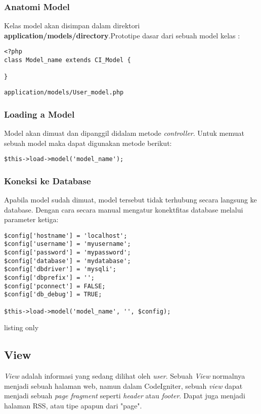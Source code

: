\subsubsection{Anatomi Model}
\label{sssec:model_1}
Kelas model akan disimpan dalam direktori \textbf{application/models/directory}.Prototipe dasar dari sebuah model kelas :

\begin{lstlisting}[frame=single]  
<?php
class Model_name extends CI_Model {

}
\end{lstlisting}

\begin{lstlisting}[frame=single]  
application/models/User_model.php
\end{lstlisting}

\subsubsection{Loading a Model}
\label{sssec:model_2}

Model akan dimuat dan dipanggil didalam metode \textit{controller}. Untuk memuat sebuah model maka dapat digunakan metode berikut:

\begin{lstlisting}[frame=single] 
$this->load->model('model_name');
\end{lstlisting}

\subsubsection{Koneksi ke Database}
\label{sssec:model_3}
Apabila model sudah dimuat, model tersebut tidak terhubung secara langsung ke database. Dengan cara secara manual mengatur konektfitas database melalui parameter ketiga:

\begin{lstlisting}[frame=single]
$config['hostname'] = 'localhost';
$config['username'] = 'myusername';
$config['password'] = 'mypassword';
$config['database'] = 'mydatabase';
$config['dbdriver'] = 'mysqli';
$config['dbprefix'] = '';
$config['pconnect'] = FALSE;
$config['db_debug'] = TRUE;

$this->load->model('model_name', '', $config);
\end{lstlisting}{listing only}

\subsection{View}
\label{subs:view}
\textit{View} adalah informasi yang sedang dilihat oleh \textit{user}. Sebuah \textit{View} normalnya menjadi sebuah halaman web, namun dalam CodeIgniter, sebuah \textit{view} dapat menjadi sebuah \textit{page fragment} seperti \textit{header} atau \textit{footer}. Dapat juga menjadi halaman RSS, atau tipe apapun dari "page".

